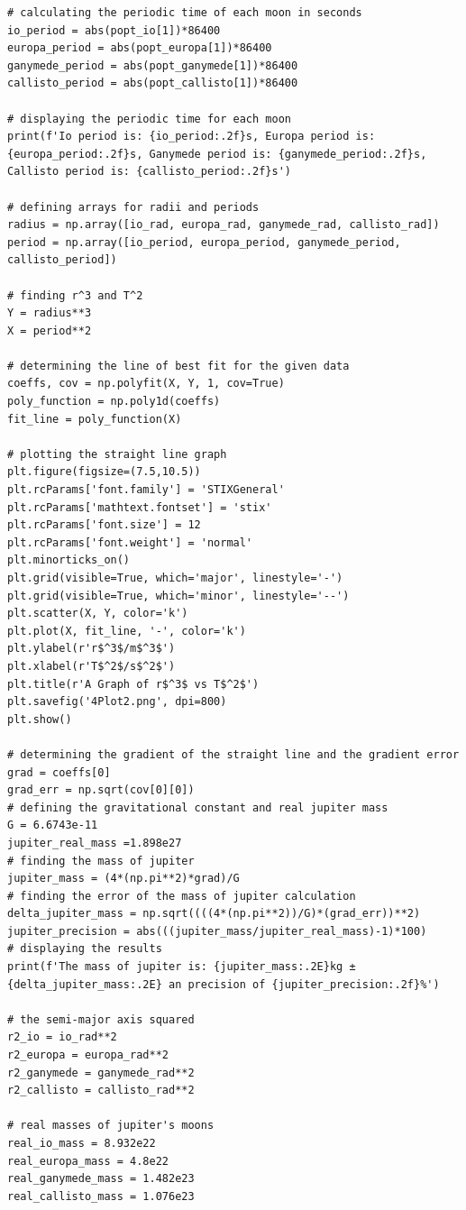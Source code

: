 \documentclass[12pt, a4paper]{article}
\begin{document}
\begin{verbatim}
# calculating the periodic time of each moon in seconds
io_period = abs(popt_io[1])*86400
europa_period = abs(popt_europa[1])*86400
ganymede_period = abs(popt_ganymede[1])*86400
callisto_period = abs(popt_callisto[1])*86400

# displaying the periodic time for each moon
print(f'Io period is: {io_period:.2f}s, Europa period is: {europa_period:.2f}s, Ganymede period is: {ganymede_period:.2f}s, Callisto period is: {callisto_period:.2f}s')

# defining arrays for radii and periods
radius = np.array([io_rad, europa_rad, ganymede_rad, callisto_rad])
period = np.array([io_period, europa_period, ganymede_period, callisto_period])

# finding r^3 and T^2
Y = radius**3
X = period**2

# determining the line of best fit for the given data
coeffs, cov = np.polyfit(X, Y, 1, cov=True)
poly_function = np.poly1d(coeffs)
fit_line = poly_function(X)

# plotting the straight line graph
plt.figure(figsize=(7.5,10.5))
plt.rcParams['font.family'] = 'STIXGeneral'
plt.rcParams['mathtext.fontset'] = 'stix'
plt.rcParams['font.size'] = 12
plt.rcParams['font.weight'] = 'normal'
plt.minorticks_on()
plt.grid(visible=True, which='major', linestyle='-')
plt.grid(visible=True, which='minor', linestyle='--')
plt.scatter(X, Y, color='k')
plt.plot(X, fit_line, '-', color='k')
plt.ylabel(r'r$^3$/m$^3$')
plt.xlabel(r'T$^2$/s$^2$')
plt.title(r'A Graph of r$^3$ vs T$^2$')
plt.savefig('4Plot2.png', dpi=800)
plt.show()

# determining the gradient of the straight line and the gradient error
grad = coeffs[0]
grad_err = np.sqrt(cov[0][0])
# defining the gravitational constant and real jupiter mass
G = 6.6743e-11
jupiter_real_mass =1.898e27
# finding the mass of jupiter
jupiter_mass = (4*(np.pi**2)*grad)/G
# finding the error of the mass of jupiter calculation
delta_jupiter_mass = np.sqrt((((4*(np.pi**2))/G)*(grad_err))**2)
jupiter_precision = abs(((jupiter_mass/jupiter_real_mass)-1)*100)
# displaying the results
print(f'The mass of jupiter is: {jupiter_mass:.2E}kg ± {delta_jupiter_mass:.2E} an precision of {jupiter_precision:.2f}%')

# the semi-major axis squared
r2_io = io_rad**2
r2_europa = europa_rad**2
r2_ganymede = ganymede_rad**2
r2_callisto = callisto_rad**2

# real masses of jupiter's moons
real_io_mass = 8.932e22
real_europa_mass = 4.8e22
real_ganymede_mass = 1.482e23
real_callisto_mass = 1.076e23


\end{verbatim}
\end{document}
